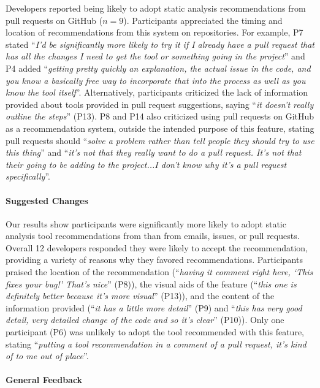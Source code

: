 Developers reported being likely to adopt static analysis recommendations from pull requests on GitHub ($n = 9$). Participants appreciated the timing and location of recommendations from this system on repositories. For example, P7 stated ``\textit{I'd be significantly more likely to try it if I already have a pull request that has all the changes I need to get the tool or something going in the project}'' and P4 added ``\textit{getting pretty quickly an explanation, the actual issue in the code, and you know a basically free way to incorporate that into the process as well as you know the tool itself}''. Alternatively, participants criticized the lack of information provided about tools provided in pull request suggestions, saying ``\textit{it doesn't really outline the steps}'' (P13). P8 and P14 also criticized using pull requests on GitHub as a recommendation system, outside the intended purpose of this feature, stating pull requests should ``\textit{solve a problem rather than tell people they should try to use this thing}'' and ``\textit{it's not that they really want to do a pull request. It's not that their going to be adding to the project...I don't know why it's a pull request specifically}''.

\paragraph*{Suggested Changes}

Our results show participants were significantly more likely to adopt static analysis tool recommendations from \sugg than from emails, issues, or pull requests. Overall 12 developers responded they were likely to accept the recommendation, providing a variety of reasons why they favored \sugg recommendations. Participants praised the location of the recommendation (``\textit{having it comment right here, `This fixes your bug!' That's nice}'' (P8)), the visual aids of the feature (``\textit{this one is definitely better because it's more visual}'' (P13)), and the content of the information provided (``\textit{it has a little more detail}'' (P9) and ``\textit{this has very good detail, very detailed change of the code and so it's clear}'' (P10)). Only one participant (P6) was unlikely to adopt the tool recommended with this feature, stating ``\textit{putting a tool recommendation in a comment of a pull request, it's kind of to me out of place}''.

\paragraph*{General Feedback}

